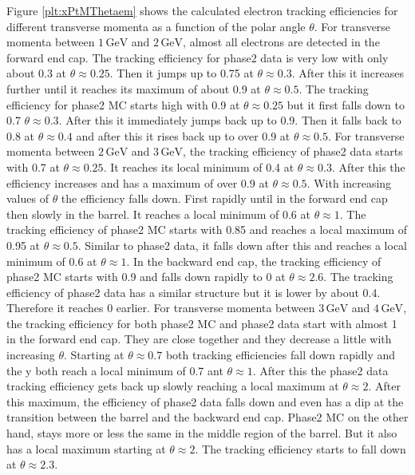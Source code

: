 \documentclass[a4paper,11pt,twosided,final,german,openbib,pdftex,listof=totoc,bibliography=totoc]{scrbook}
\begin{document}
Figure \ref{plt:xPtMThetaem} shows the calculated electron tracking efficiencies for different transverse momenta as a function of the polar angle $\theta$. For transverse momenta between $1\,\textrm{GeV}$ and $2\,\textrm{GeV}$, almost all electrons are detected in the forward end cap.  The tracking efficiency for phase2 data is very low with only about 0.3 at $\theta \approx 0.25$. Then it jumps up to 0.75 at $\theta \approx 0.3$. After this it increases further until it reaches its maximum of about 0.9 at $\theta \approx 0.5$. The tracking efficiency for phase2 MC starts high with 0.9 at $\theta \approx 0.25$ but it first falls down to 0.7 $\theta \approx 0.3$. After this it immediately jumps back up to 0.9. Then it falls back to 0.8 at $\theta \approx 0.4$ and after this it rises back up to over 0.9 at $\theta \approx 0.5$.
For transverse momenta between $2\,\textrm{GeV}$ and $3\,\textrm{GeV}$, the tracking efficiency of phase2 data starts with 0.7 at $\theta \approx 0.25$. It reaches its local minimum of 0.4 at $\theta \approx 0.3$. After this the efficiency increases and has a maximum of over 0.9 at $\theta \approx 0.5$. With increasing values of $\theta$ the efficiency falls down. First rapidly until in the forward end cap then slowly in the barrel. It reaches a local minimum of 0.6 at $\theta \approx 1$. The tracking efficiency of phase2 MC starts with 0.85 and reaches a local maximum of 0.95 at $\theta \approx 0.5$. Similar to phase2 data, it falls down after this and reaches a local minimum of 0.6 at $\theta \approx 1$. In the backward end cap, the tracking efficiency of phase2 MC starts with 0.9 and falls down rapidly to 0 at $\theta \approx 2.6$. The tracking efficiency of phase2 data has a similar structure but it is lower by about 0.4. Therefore it reaches 0 earlier.
For transverse momenta between $3\,\textrm{GeV}$ and $4\,\textrm{GeV}$, the tracking efficiency for both phase2 MC and phase2 data start with almost 1 in the forward end cap. They are close together and they decrease a little with increasing $\theta$. Starting at $\theta \approx 0.7$ both tracking efficiencies fall down rapidly and the y both reach a local minimum of 0.7 ant $\theta \approx 1$. After this the phase2 data tracking efficiency gets back up slowly reaching a local maximum at $\theta \approx 2$. After this maximum, the efficiency of phase2 data falls down and even has a dip at the transition between the barrel and the backward end cap. Phase2 MC on the other hand, stays more or less the same in the middle region of the barrel. But it also has a local maximum starting at $\theta \approx 2$. The tracking efficiency starts to fall down at $\theta \approx 2.3$.
\end{document}
